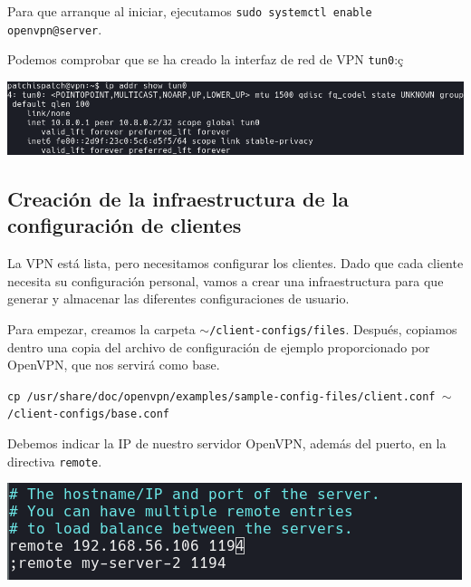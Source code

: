 \documentclass[11pt,a4paper]{article}
\begin{document}
\medskip

Para que arranque al iniciar, ejecutamos \texttt{sudo systemctl enable openvpn@server}.

Podemos comprobar que se ha creado la interfaz de red de VPN \texttt{tun0}:ç

\medskip

\begin{center}
\includegraphics[scale=0.4]{tun0.png}
\end{center}

\medskip

\subsection{Creación de la infraestructura de la configuración de clientes}

La VPN está lista, pero necesitamos configurar los clientes. Dado que cada cliente necesita su configuración personal, vamos a crear una infraestructura para que generar y almacenar las diferentes configuraciones de usuario.

\medskip

Para empezar, creamos la carpeta \texttt{$\sim$/client-configs/files}. Después, copiamos dentro una copia del archivo de configuración de ejemplo proporcionado por OpenVPN, que nos servirá como base.

\medskip

\texttt{\small{cp /usr/share/doc/openvpn/examples/sample-config-files/client.conf $\sim$/client-configs/base.conf}}

\bigskip

Debemos indicar la IP de nuestro servidor OpenVPN, además del puerto, en la directiva \texttt{remote}.

\medskip

\begin{center}
\includegraphics[scale=0.4]{remote.png}
\end{center}
\end{document}
